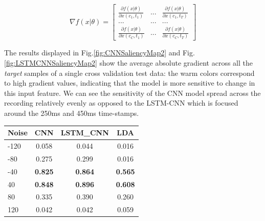 \documentclass[
12pt, %
english, %
doublespacing, %
headsepline, %
]{MastersDoctoralThesis} %
\begin{document}
	
	\begin{equation}\label{eq:4}
	\nabla f\left( {x|\theta } \right) = \left[ {\begin{array}{*{20}{c}}
		{\frac{{\partial f\left( {x|\theta } \right)}}{{\partial x\left( {{c_1},{t_1}} \right)}}}&{...}&{\frac{{\partial f\left( {x|\theta } \right)}}{{\partial x\left( {{c_1},{t_T}} \right)}}}\\
		{...}&{...}&{...}\\
		{\frac{{\partial f\left( {x|\theta } \right)}}{{\partial x\left( {{c_C},{t_1}} \right)}}}&{...}&{\frac{{\partial f\left( {x|\theta } \right)}}{{\partial x\left( {{c_C},{t_T}} \right)}}}
		\end{array}} \right]
	\end{equation}

\vspace{1cm}
The results displayed in Fig.\ref{fig:CNNSaliencyMap2} and Fig.\ref{fig:LSTMCNNSaliencyMap2} show the average absolute gradient across all the \textit{target} samples of a single cross validation test data: the warm colors correspond to high gradient values, indicating that the model is more sensitive to change in this input feature. We can see the sensitivity of the CNN model spread across the recording relatively evenly as opposed to the LSTM-CNN which is focused around the 250ms and 450ms time-stamps.

\begin{small}
	\label{table:ResistenceToNoise}
	\centering
	
	\begin{tabular}{l|ccc}
		\toprule
		{Noise} &  CNN &  LSTM\_CNN &  LDA\\
		\midrule
		-120  &         0.058 &              0.044 &         0.016 \\
		-80   &         0.275 &              0.299 &         0.016 \\
		-40   &         \textbf{0.825} &              \textbf{0.864} &  \textbf{0.565} \\
		40   &         \textbf{0.848} &              \textbf{0.896} &   \textbf{0.608} \\
		80   &         0.335 &              0.390 &         0.260 \\
		120  &         0.042 &              0.042 &         0.059 \\
		\bottomrule
	\end{tabular}
	
\end{small}
\end{document}
